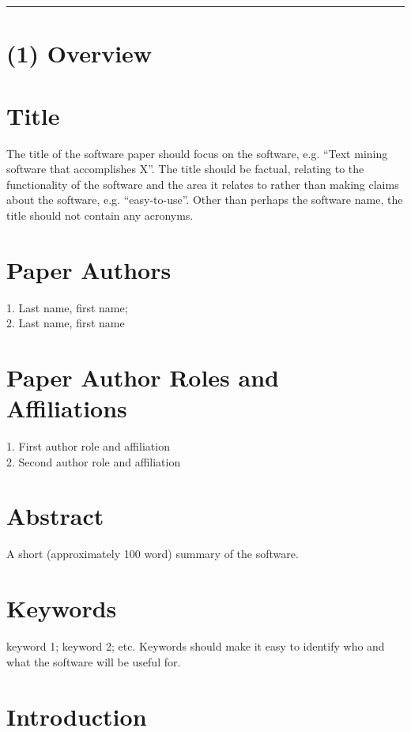 \documentclass{jors}
\begin{document}
\rule{\textwidth}{1pt}

\section*{(1) Overview}

\vspace{0.5cm}

\section*{Title}

The title of the software paper should focus on the software, e.g. “Text mining software that accomplishes X”. The title should be factual, relating to the functionality of the software and the area it relates to rather than making claims about the software, e.g. “easy-to-use”. Other than perhaps the software name, the title should not contain any acronyms.

\section*{Paper Authors}

1. Last name, first name; \\
2. Last name, first name

\section*{Paper Author Roles and Affiliations}

1. First author role and affiliation \\
2. Second author role and affiliation

\section*{Abstract}

A short (approximately 100 word) summary of the software.

\section*{Keywords}

keyword 1; keyword 2; etc. Keywords should make it easy to identify who and what the software will be useful for.

\section*{Introduction}
\end{document}
